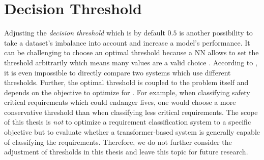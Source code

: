 \section{Decision Threshold}
\label{chp:future_work:sec:decision_threshold}
Adjusting the \textit{decision threshold} which is by default $0.5$ is another possibility to take a dataset's imbalance into account and increase a model's performance.
It can be challenging to choose an optimal threshold because a \ac{NN} allows to set the threshold arbitrarily which means many values are a valid choice \parencite{Mazurowski:2008}.
According to \textcite{Mazurowski:2008}, it is even impossible to directly compare two systems which use different thresholds.
Further, the optimal threshold is coupled to the problem itself and depends on the objective to optimize for \parencite{Brown:2019}.
For example, when classifying safety critical requirements which could endanger lives, one would choose a more conservative threshold than when classifying less critical requirements.
The scope of this thesis is \textit{not} to optimize a requirement classification system to a specific objective but to evaluate whether a transformer-based system is generally capable of classifying the requirements.
Therefore, we do not further consider the adjustment of thresholds in this thesis and leave this topic for future research.
